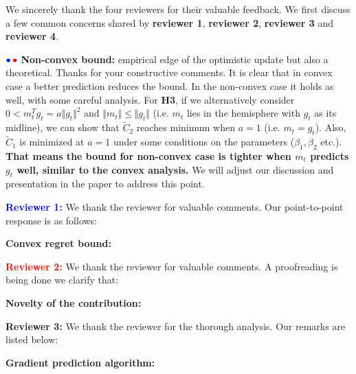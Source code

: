 \documentclass{article}
\begin{document}
We sincerely thank the four reviewers for their valuable feedback. 
We first discuss a few common concerns shared by \textbf{\color{blue}reviewer 1}, \textbf{\color{red} reviewer 2}, \textbf{\color{green!50!black}reviewer 3} and \textbf{\color{purple}reviewer 4}. \vspace{-5pt}

${\color{blue}\bullet}\!~{\color{red}\bullet}$ \textbf{Non-convex bound:} 
 empirical edge of the optimistic update but also a theoretical. 
Thanks for your constructive comments. It is clear that in convex case a better prediction reduces the bound. In the non-convex case it holds as well, with some careful analysis. For \textbf{H3}, if we alternatively consider $0<m_t^T g_t=a\Vert g_t\Vert^2$ and $\Vert m_t\Vert\leq \Vert g_t\Vert$ (i.e. $m_t$ lies in the hemisphere with $g_t$ as its midline), we can show that $\tilde C_2$ reaches minimum when $a=1$ (i.e. $m_t=g_t$). Also, $\tilde C_1$ is minimized at $a=1$ under some conditions on the parameters ($\beta_1,\beta_2$ etc.). \textbf{That means the bound for non-convex case is tighter when $m_t$ predicts $g_t$ well, similar to the convex analysis.} We will adjust our discussion and presentation in the paper to address this point. \vspace{-5pt}


\vspace{0.05in}

\textbf{\textcolor{blue}{Reviewer 1:}} We thank the reviewer for valuable comments. Our point-to-point response is as follows:\vspace{-5pt}


\textbf{Convex regret bound:} 


\vspace{0.05in}


\textbf{\textcolor{red}{Reviewer 2:}} We thank the reviewer for valuable comments. A proofreading is being done we clarify that:\vspace{-5pt}

\textbf{Novelty of the contribution:} 


\vspace{0.05in}
\textbf{\textcolor{green!50!black}{Reviewer 3:}} We thank the reviewer for the thorough analysis. Our remarks are listed below:\vspace{-5pt}

\textbf{Gradient prediction algorithm:}
\end{document}
